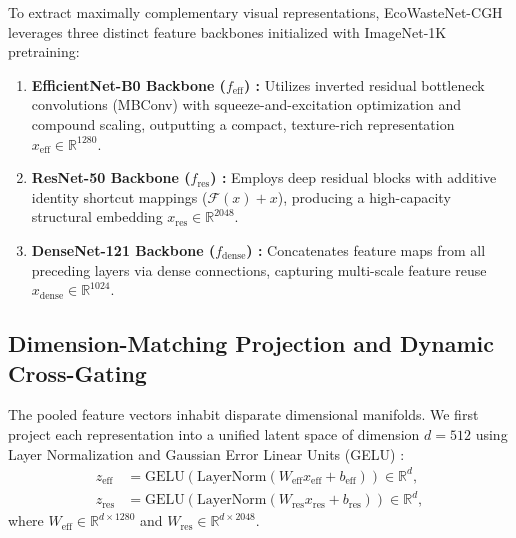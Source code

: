 \documentclass[11pt,a4paper]{article}
\begin{document}
To extract maximally complementary visual representations, EcoWasteNet-CGH leverages three distinct feature backbones initialized with ImageNet-1K pretraining:
\begin{enumerate}[leftmargin=*]
  \item \textbf{EfficientNet-B0 Backbone ($f_{\text{eff}}$) \cite{tan2019}:} Utilizes inverted residual bottleneck convolutions (MBConv) \cite{sandler2018} with squeeze-and-excitation optimization \cite{hu2018} and compound scaling, outputting a compact, texture-rich representation $x_{\text{eff}} \in \mathbb{R}^{1280}$.
  \item \textbf{ResNet-50 Backbone ($f_{\text{res}}$) \cite{he2016}:} Employs deep residual blocks with additive identity shortcut mappings ($\mathcal{F}(x) + x$), producing a high-capacity structural embedding $x_{\text{res}} \in \mathbb{R}^{2048}$.
  \item \textbf{DenseNet-121 Backbone ($f_{\text{dense}}$) \cite{huang2017}:} Concatenates feature maps from all preceding layers via dense connections, capturing multi-scale feature reuse $x_{\text{dense}} \in \mathbb{R}^{1024}$.
\end{enumerate}

\subsection{Dimension-Matching Projection and Dynamic Cross-Gating}
The pooled feature vectors inhabit disparate dimensional manifolds. We first project each representation into a unified latent space of dimension $d = 512$ using Layer Normalization \cite{ba2016} and Gaussian Error Linear Units (GELU) \cite{hendrycks2016}:
\begin{align}
  z_{\text{eff}} &= \mathrm{GELU}\left(\mathrm{LayerNorm}\left(W_{\text{eff}} x_{\text{eff}} + b_{\text{eff}}\right)\right) \in \mathbb{R}^d, \\
  z_{\text{res}} &= \mathrm{GELU}\left(\mathrm{LayerNorm}\left(W_{\text{res}} x_{\text{res}} + b_{\text{res}}\right)\right) \in \mathbb{R}^d,
\end{align}
where $W_{\text{eff}} \in \mathbb{R}^{d \times 1280}$ and $W_{\text{res}} \in \mathbb{R}^{d \times 2048}$.
\end{document}
